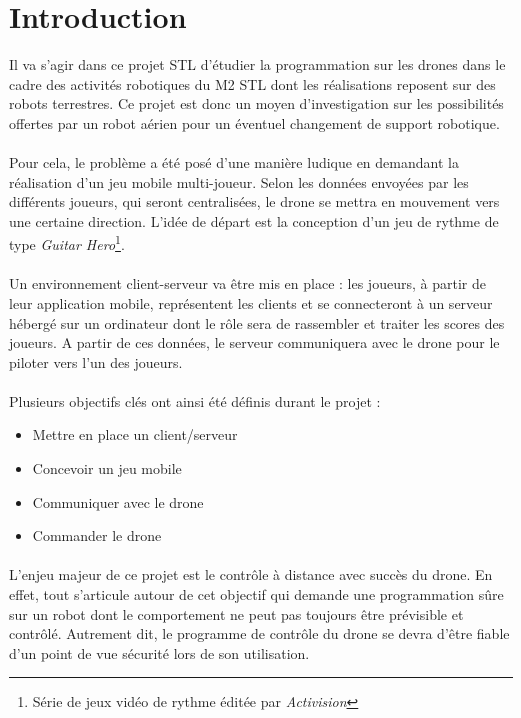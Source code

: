 \newpage
\section{Introduction}

Il va s'agir dans ce projet STL d'étudier la programmation sur les drones dans le cadre des activités robotiques du M2 STL dont les réalisations reposent sur des robots terrestres. Ce projet est donc un moyen d'investigation sur les possibilités offertes par un robot aérien pour un éventuel changement de support robotique.

\paragraph{}
Pour cela, le problème a été posé d'une manière ludique en demandant la réalisation d'un jeu mobile multi-joueur. Selon les données envoyées par les différents joueurs, qui seront centralisées, le drone se mettra en mouvement vers une certaine direction. L'idée de départ est la conception d'un jeu de rythme de type \textit{Guitar Hero}\footnote{Série de jeux vidéo de rythme éditée par \textit{Activision}}.

\paragraph{}
Un environnement client-serveur va être mis en place : les joueurs, à partir de leur application mobile, représentent les clients et se connecteront à un serveur hébergé sur un ordinateur dont le rôle sera de rassembler et traiter les scores des joueurs. A partir de ces données, le serveur communiquera avec le drone pour le piloter vers l'un des joueurs. 

\paragraph{}
Plusieurs objectifs clés ont ainsi été définis durant le projet :
\begin{itemize}
\item Mettre en place un client/serveur
\item Concevoir un jeu mobile
\item Communiquer avec le drone
\item Commander le drone
\end{itemize}

\paragraph{}
L'enjeu majeur de ce projet est le contrôle à distance avec succès du drone. En effet, tout s'articule autour de cet objectif qui demande une programmation sûre sur un robot dont le comportement ne peut pas toujours être prévisible et contrôlé. Autrement dit, le programme de contrôle du drone se devra d'être fiable d'un point de vue sécurité lors de son utilisation.

